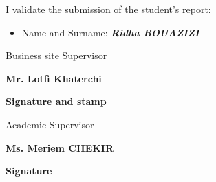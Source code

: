 \thispagestyle{empty}

I validate the submission of the student’s report:
\begin{itemize}
    \setlength{\itemindent}{4em}
    \item Name and Surname: \textbf{\emph{Ridha BOUAZIZI}}
\end{itemize}
\vspace{1mm}
\begin{center}
    \begin{minipage}[l]{1\columnwidth}
        \begin{tcolorbox}[colback=white,boxrule=2pt,arc=10pt,height=105mm]{
            \vspace{1cm}
            \begin{center}
                \Large
                Business site Supervisor
                
                \textbf{Mr. Lotfi Khaterchi}
            \end{center}
            \vspace{5mm}
            \hspace{0.63\columnwidth}\textbf{\large Signature and stamp}
        }
        \end{tcolorbox}
    \end{minipage}
    
    \vspace{2cm}
    
    \begin{minipage}[l]{1\columnwidth}
        \begin{tcolorbox}[colback=white,boxrule=2pt,arc=10pt,height=105mm]{
            \vspace{1cm}
            \large 
            \vspace{1mm}
            \begin{center}
                \Large
                Academic Supervisor
                
                \textbf{Ms. Meriem CHEKIR}
            \end{center}
            \vspace{5mm}
            \hspace{0.72\columnwidth}\textbf{\large Signature}
        }
        \end{tcolorbox}
    \end{minipage}
\end{center}